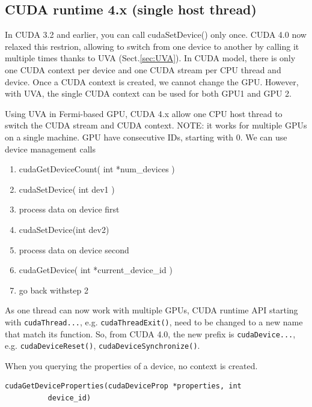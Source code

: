 \subsection{CUDA runtime 4.x (single host thread)}
\label{sec:GPUs_cuda4_singlethread}

In CUDA 3.2 and earlier, you can call cudaSetDevice() only once. CUDA 4.0 now
relaxed this restrion, allowing to switch from one device to another by calling
it multiple times thanks to UVA (Sect.\ref{sec:UVA}). In CUDA model, there is
only one CUDA context per device and one CUDA stream per CPU thread and device.
Once a CUDA context is created, we cannot change the GPU. However, with UVA, the
single CUDA context can be used for both GPU1 and GPU 2.

Using UVA in Fermi-based GPU, CUDA 4.x allow one CPU host thread to switch the
CUDA stream and CUDA context. NOTE: it works for multiple GPUs on a single
machine. GPU have consecutive IDs, starting with 0. We can use device management
calls
\begin{enumerate}
\item cudaGetDeviceCount( int *num\_devices )
\item cudaSetDevice( int dev1 )
\item process data on device first
\item cudaSetDevice(int dev2)
\item process data on device second
\item cudaGetDevice( int *current\_device\_id )
\item go back withstep 2
\end{enumerate}
As one thread can now work with multiple GPUs, CUDA runtime API
starting with \verb!cudaThread...!, e.g. \verb!cudaThreadExit()!, need to be
changed to a new name that match its function. So, from CUDA 4.0, the new
prefix is \verb!cudaDevice...!, e.g. \verb!cudaDeviceReset()!,
\verb!cudaDeviceSynchronize()!. 

When you querying the properties of a device, no context is created. 
\begin{lstlisting}
cudaGetDeviceProperties(cudaDeviceProp *properties, int
          device_id)
\end{lstlisting}




